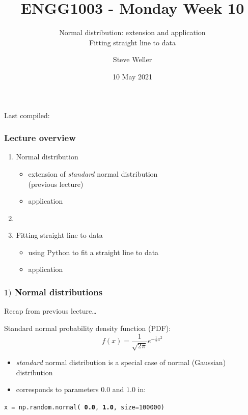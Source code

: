 \documentclass[english,14pt]{beamer}
\title{ENGG1003 - Monday Week 10}
\subtitle{Normal distribution: extension and application \\ Fitting straight line to data}%
\author{Steve Weller}
\institute{University of Newcastle}
\date{10 May 2021}
\newcommand\red[1]{{\color{red} #1}}
\newcommand\blue[1]{{\color{blue} #1}}
\begin{document}
\begin{flushleft}
{\scriptsize Last compiled:~\DTMnow}
\vspace*{-5mm}
\end{flushleft}
\framebreak


\begin{frame}[fragile]

\frametitle{Lecture overview}
\begin{enumerate}
	\item Normal distribution
		\begin{itemize}
			\item extension of \emph{standard} normal distribution \\ (previous lecture)
			\item application
		\end{itemize}	
	\item[]
	
	\item Fitting straight line to data
	\begin{itemize}
		\item using Python to fit a straight line to data
		\item application
	\end{itemize}	
\end{enumerate}

\end{frame}


\begin{frame}[fragile]

\frametitle{$1)$ Normal distributions}

Recap from previous lecture\ldots

Standard normal probability density function (PDF):
\[
\boxed{
f(x) = \frac{1}{\sqrt{2\pi}} e^{-\frac{1}{2}x^2}}
\]

\begin{itemize}
	\item \emph{standard} normal distribution is a special case of normal (Gaussian) distribution
	\item corresponds to parameters \red{$\mathbf{0.0}$} and \blue{$\mathbf{1.0}$} in:
\end{itemize}

{\small
	\texttt{x = np.random.normal(\textbf{\red{0.0}}, \textbf{\blue{1.0}}, size=100000)}
}

\end{frame}
\end{document}
